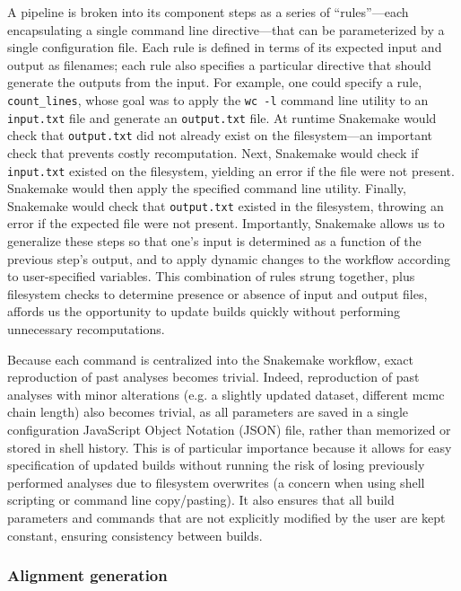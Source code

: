A pipeline is broken into its component steps as a series of ``rules''---each encapsulating a single command line directive---that can be parameterized by a single configuration file.
Each rule is defined in terms of its expected input and output as filenames; each rule also specifies a particular directive that should generate the outputs from the input.
For example, one could specify a rule, \texttt{count\_lines}, whose goal was to apply the \texttt{wc -l} command line utility to an \texttt{input.txt} file and generate an \texttt{output.txt} file.
At runtime Snakemake would check that \texttt{output.txt} did not already exist on the filesystem---an important check that prevents costly recomputation.
Next, Snakemake would check if \texttt{input.txt} existed on the filesystem, yielding an error if the file were not present.
Snakemake would then apply the specified command line utility.
Finally, Snakemake would check that \texttt{output.txt} existed in the filesystem, throwing an error if the expected file were not present.
Importantly, Snakemake allows us to generalize these steps so that one's input is determined as a function of the previous step's output, and to apply dynamic changes to the workflow according to user-specified variables.
This combination of rules strung together, plus filesystem checks to determine presence or absence of input and output files, affords us the opportunity to update builds quickly without performing unnecessary recomputations.

Because each command is centralized into the Snakemake workflow, exact reproduction of past analyses becomes trivial.
Indeed, reproduction of past analyses with minor alterations (e.g. a slightly updated dataset, different \gls{mcmc} chain length) also becomes trivial, as all parameters are saved in a single configuration JavaScript Object Notation (JSON) file, rather than memorized or stored in shell history.
This is of particular importance because it allows for easy specification of updated builds without running the risk of losing previously performed analyses due to filesystem overwrites (a concern when using shell scripting or command line copy/pasting).
It also ensures that all build parameters and commands that are not explicitly modified by the user are kept constant, ensuring consistency between builds.

\subsubsection{Alignment generation}

